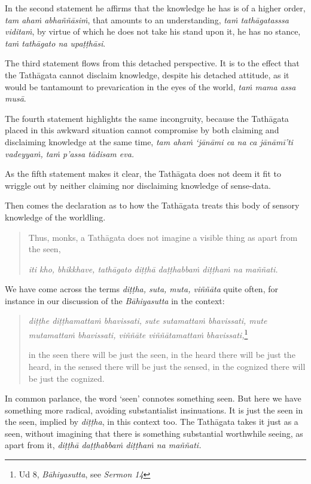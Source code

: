 In the second statement he affirms that the knowledge he has is of a higher order, \emph{tam ahaṁ abhaññāsiṁ}, that amounts to an understanding, \emph{taṁ tathāgatasssa viditaṁ}, by virtue of which he does not take his stand upon it, he has no stance, \emph{taṁ tathāgato na upaṭṭhāsi}.

The third statement flows from this detached perspective. It is to the effect that the Tathāgata cannot disclaim knowledge, despite his detached attitude, as it would be tantamount to prevarication in the eyes of the world, \emph{taṁ mama assa musā}.

The fourth statement highlights the same incongruity, because the Tathāgata placed in this awkward situation cannot compromise by both claiming and disclaiming knowledge at the same time, \emph{tam ahaṁ `jānāmi ca na ca jānāmī'ti vadeyyaṁ, taṁ p'assa tādisam eva.}

As the fifth statement makes it clear, the Tathāgata does not deem it fit to wriggle out by neither claiming nor disclaiming knowledge of sense-data.

Then comes the declaration as to how the Tathāgata treats this body of sensory knowledge of the worldling.

\begin{quote}
Thus, monks, a Tathāgata does not imagine a visible thing as apart from the seen,

\emph{iti kho, bhikkhave, tathāgato diṭṭhā daṭṭhabbaṁ diṭṭhaṁ na maññati.}
\end{quote}

We have come across the terms \emph{diṭṭha, suta, muta, viññāta} quite often, for instance in our discussion of the \emph{Bāhiyasutta} in the context:

\begin{quote}
\emph{diṭṭhe diṭṭhamattaṁ bhavissati, sute sutamattaṁ bhavissati, mute mutamattaṁ bhavissati, viññāte viññātamattaṁ bhavissati,}\footnote{Ud 8, \emph{Bāhiyasutta}, see \emph{Sermon 14}}

in the seen there will be just the seen, in the heard there will be just the heard, in the sensed there will be just the sensed, in the cognized there will be just the cognized.
\end{quote}

In common parlance, the word `seen' connotes something seen. But here we have something more radical, avoiding substantialist insinuations. It is just the seen in the seen, implied by \emph{diṭṭha}, in this context too. The Tathāgata takes it just as a seen, without imagining that there is something substantial worthwhile seeing, as apart from it, \emph{diṭṭhā daṭṭhabbaṁ diṭṭhaṁ na maññati.}


